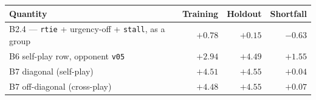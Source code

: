 \begin{tabular}{lrrr}
\toprule
Quantity & Training & Holdout & Shortfall \\
\midrule
B2.4 --- \texttt{rtie} + urgency-off + \texttt{stall}, as a group & $+0.78$ & $+0.15$ & $-0.63$ \\
B6 self-play row, opponent \texttt{v05} & $+2.94$ & $+4.49$ & $+1.55$ \\
B7 diagonal (self-play) & $+4.51$ & $+4.55$ & $+0.04$ \\
B7 off-diagonal (cross-play) & $+4.48$ & $+4.55$ & $+0.07$ \\
\bottomrule
\end{tabular}
